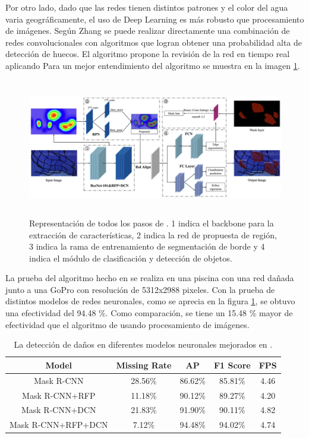 Por otro lado, dado que las redes tienen distintos patrones y el color del agua varia geográficamente, el uso de Deep Learning es más robusto que procesamiento de imágenes. Según Zhang \cite{cite:Zhang} se puede realizar directamente una combinación de redes convolucionales con algoritmos que logran obtener una probabilidad alta de detección de huecos. El algoritmo propone la revisión de la red en tiempo real aplicando Para un mejor entendimiento del algoritmo se muestra en la imagen \ref{fig:Zhang_1}.

\begin{figure}[!h]
    \begin{center}
    \includegraphics[height=6cm]{images/Zhang_1} 
    \caption{\label{fig:Zhang_1}Representación de todos los pasos de \cite{cite:Zhang}. 1 indica el backbone para la extracción de características, 2 indica la red de propuesta de región, 3 indica la rama de entrenamiento de segmentación de borde y 4 indica el módulo de clasificación y detección de objetos.}
    \end{center}
\end{figure}


La prueba del algoritmo hecho en \cite{cite:Zhang} se realiza en una piscina con una red dañada junto a una GoPro con resolución de 5312x2988 pixeles. Con la prueba de distintos modelos de redes neuronales, como se aprecia en la figura \ref{tab:Zhang}, se obtuvo una efectividad del 94.48 \%. Como comparación, se tiene un 15.48 \% mayor de efectividad que el algoritmo de \cite{cite:Betancourt} usando procesamiento de imágenes. 
\begin{table}[h!]
    \centering
    \begin{tabular}{ccccc}
        Model & Missing Rate & AP & F1 Score & FPS \\
        \hline
        Mask R-CNN & 28.56\% & 86.62\% & 85.81\% &  4.46 \\
        Mask R-CNN+RFP & 11.18\% & 90.12\% & 89.27\% & 4.20 \\
        Mask R-CNN+DCN & 21.83\% & 91.90\% & 90.11\% & 4.82 \\
        Mask R-CNN+RFP+DCN & 7.12\% & 94.48\% & 94.02\% & 4.74 \\
        \hline
    \end{tabular}
    \caption{La detección de daños en diferentes modelos neuronales mejorados en \cite{cite:Zhang}.}
    \label{tab:Zhang}
\end{table}



